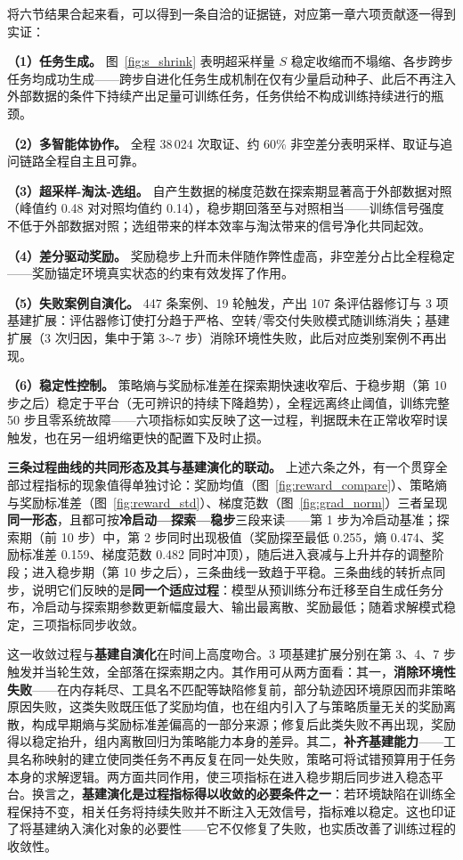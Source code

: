 将六节结果合起来看，可以得到一条自洽的证据链，对应第一章六项贡献逐一得到实证：

\textbf{（1）任务生成。} 图~\ref{fig:s_shrink} 表明超采样量 $S$ 稳定收缩而不塌缩、各步跨步任务均成功生成——跨步自进化任务生成机制在仅有少量启动种子、此后不再注入外部数据的条件下持续产出足量可训练任务，任务供给不构成训练持续进行的瓶颈。

\textbf{（2）多智能体协作。} 全程 38\,024 次取证、约 60\% 非空差分表明采样、取证与追问链路全程自主且可靠。

\textbf{（3）超采样-淘汰-选组。} 自产生数据的梯度范数在探索期显著高于外部数据对照（峰值约 0.48 对对照均值约 0.14），稳步期回落至与对照相当——训练信号强度不低于外部数据对照；选组带来的样本效率与淘汰带来的信号净化共同起效。

\textbf{（4）差分驱动奖励。} 奖励稳步上升而未伴随作弊性虚高，非空差分占比全程稳定——奖励锚定环境真实状态的约束有效发挥了作用。

\textbf{（5）失败案例自演化。} 447 条案例、19 轮触发，产出 107 条评估器修订与 3 项基建扩展：评估器修订使打分趋于严格、空转/零交付失败模式随训练消失；基建扩展（3 次归因，集中于第 3$\sim$7 步）消除环境性失败，此后对应类别案例不再出现。

\textbf{（6）稳定性控制。} 策略熵与奖励标准差在探索期快速收窄后、于稳步期（第 10 步之后）稳定于平台（无可辨识的持续下降趋势），全程远离终止阈值，训练完整 50 步且零系统故障——六项指标如实反映了这一过程，判据既未在正常收窄时误触发，也在另一组坍缩更快的配置下及时止损。

\textbf{三条过程曲线的共同形态及其与基建演化的联动。} 上述六条之外，有一个贯穿全部过程指标的现象值得单独讨论：奖励均值（图~\ref{fig:reward_compare}）、策略熵与奖励标准差（图~\ref{fig:reward_std}）、梯度范数（图~\ref{fig:grad_norm}）三者呈现\textbf{同一形态}，且都可按\textbf{冷启动—探索—稳步}三段来读——第 1 步为冷启动基准；探索期（前 10 步）中，第 2 步同时出现极值（奖励探至最低 0.255，熵 0.474、奖励标准差 0.159、梯度范数 0.482 同时冲顶），随后进入衰减与上升并存的调整阶段；进入稳步期（第 10 步之后），三条曲线一致趋于平稳。三条曲线的转折点同步，说明它们反映的是\textbf{同一个适应过程}：模型从预训练分布迁移至自生成任务分布，冷启动与探索期参数更新幅度最大、输出最离散、奖励最低；随着求解模式稳定，三项指标同步收敛。

这一收敛过程与\textbf{基建自演化}在时间上高度吻合。3 项基建扩展分别在第 3、4、7 步触发并当轮生效，全部落在探索期之内。其作用可从两方面看：其一，\textbf{消除环境性失败}——在内存耗尽、工具名不匹配等缺陷修复前，部分轨迹因环境原因而非策略原因失败，这类失败既压低了奖励均值，也在组内引入了与策略质量无关的奖励离散，构成早期熵与奖励标准差偏高的一部分来源；修复后此类失败不再出现，奖励得以稳定抬升，组内离散回归为策略能力本身的差异。其二，\textbf{补齐基建能力}——工具名称映射的建立使同类任务不再反复在同一处失败，策略可将试错预算用于任务本身的求解逻辑。两方面共同作用，使三项指标在进入稳步期后同步进入稳态平台。换言之，\textbf{基建演化是过程指标得以收敛的必要条件之一}：若环境缺陷在训练全程保持不变，相关任务将持续失败并不断注入无效信号，指标难以稳定。这也印证了将基建纳入演化对象的必要性——它不仅修复了失败，也实质改善了训练过程的收敛性。

